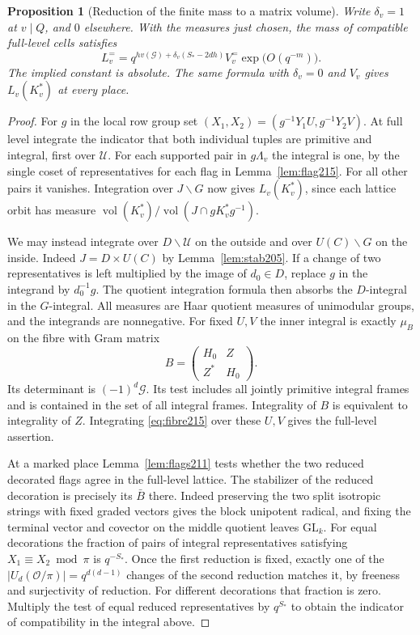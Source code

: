 \documentclass[a4paper,11pt]{article}
\newtheorem{proposition}{Proposition}[section]
\theoremstyle{definition}
\theoremstyle{remark}
\numberwithin{equation}{section}
\begin{document}
\begin{proposition}[Reduction of the finite mass to a matrix volume]
\label{prop:marked215}
Write \(\delta_v=1\) at \(v\mid Q\), and \(0\) elsewhere. With
the measures just chosen, the mass of compatible full-level
cells satisfies
\begin{equation}
 L_v^{=}=q^{h v(\mathcal G)+\delta_v(S_*-2dh)}
             V_v^{=}\exp\bigl(O(q^{-m})\bigr).
 \label{eq:finite215}
\end{equation}
The implied constant is absolute. The same formula with
\(\delta_v=0\) and \(V_v\) gives \(L_v(K_v^*)\) at every place.
\end{proposition}
\begin{proof}
For \(g\) in the local row group set
\((X_1,X_2)=(g^{-1}Y_1U,g^{-1}Y_2V)\).
At full level integrate the indicator that both individual
tuples are primitive and integral, first over \(\mathcal U\).
For each supported pair in \(g\Lambda_v\) the integral is one,
by the single coset of representatives for each flag in
Lemma~\ref{lem:flag215}. For all other pairs it vanishes.
Integration over \(J\backslash G\) now gives \(L_v(K_v^*)\),
since each lattice orbit has measure
\(\operatorname{vol}(K_v^*)/\operatorname{vol}(J\cap gK_v^*g^{-1})\).

We may instead integrate over \(D\backslash\mathcal U\) on the
outside and over \(U(C)\backslash G\) on the inside. Indeed
\(J=D\times U(C)\) by Lemma~\ref{lem:stab205}. If a change of
two representatives is left multiplied by the image of
\(d_0\in D\), replace \(g\) in the integrand by \(d_0^{-1}g\).
The quotient integration formula then absorbs the \(D\)-integral
in the \(G\)-integral. All measures are Haar quotient measures
of unimodular groups, and the integrands are nonnegative.
For fixed \(U,V\) the inner integral is exactly \(\mu_B\) on
the fibre with Gram matrix
\[
                    B=\begin{pmatrix}H_0&Z\\Z^*&H_0\end{pmatrix}.
\]
Its determinant is \((-1)^d\mathcal G\). Its test includes all
jointly primitive integral frames and is contained in the set
of all integral frames. Integrality of \(B\) is equivalent to
integrality of \(Z\). Integrating \eqref{eq:fibre215} over these
\(U,V\) gives the full-level assertion.

At a marked place Lemma~\ref{lem:flags211} tests whether the
two reduced decorated flags agree in the full-level lattice.
The stabilizer of the reduced decoration is precisely its
\(\bar B\) there. Indeed preserving the two split isotropic
strings with fixed graded vectors gives the block unipotent
radical, and fixing the terminal vector and covector on the
middle quotient leaves \(\mathrm{GL}_k\). For equal decorations
the fraction of pairs of integral representatives satisfying
\(X_1\equiv X_2\bmod\pi\) is \(q^{-S_*}\). Once the first
reduction is fixed, exactly one of the
\(|U_d(\mathcal O/\pi)|=q^{d(d-1)}\) changes of the second
reduction matches it, by freeness and surjectivity of reduction.
For different decorations that fraction is zero. Multiply the
test of equal reduced representatives by \(q^{S_*}\) to obtain
the indicator of compatibility in the integral above.


\end{proof}
\end{document}
